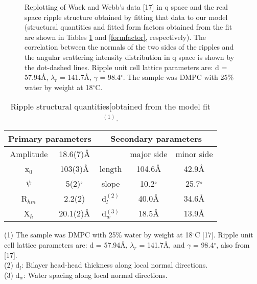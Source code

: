 \pagebreak

\begin{figure}
\centerline {}
\vspace{11pt}
\caption{Replotting of Wack and Webb's data [17] in q space and the 
real space
ripple structure obtained by fitting that data to our model (structural
quantities and fitted form factors obtained from the fit 
are shown in Tables \ref{parameter} and \ref{formfactor}, respectively). 
The correlation between the normals of the two sides of the ripples and the 
angular scattering intensity distribution in q space is shown by the
dot-dashed lines. Ripple unit cell lattice parameters are: d = 57.94\AA, 
$\lambda_r$ = 141.7\AA, $\gamma$ = 98.4$^{\circ}$. The sample was DMPC with 
25\% water by weight at 18$^{\circ}$C.
\label{wack_data}}
\end{figure}

\pagebreak

\begin{table}
\caption{Ripple structural quantities[obtained from the model fit$^{(1)}$.
\label{parameter}}
\vspace{6pt}
{\tabcolsep=0.35in
\begin{tabular}{c|c||c|c|c} 
\multicolumn{2}{c||}{Primary parameters} & 
\multicolumn{3}{c}{Secondary parameters} \\ \hline
Amplitude & 18.6(7)\AA & & major side & minor side \\ \cline{4-5}
x$_0$ & 103(3)\AA & length & 104.6\AA & 42.9\AA \\
$\psi$ & 5(2)$^{\circ}$ & slope & 10.2$^{\circ}$ & 25.7$^{\circ}$ \\
R$_{hm}$ & 2.2(2) & d$_l^{(2)}$ & 40.0\AA & 34.6\AA \\
X$_h$ & 20.1(2)\AA & d$_w^{(3)}$ & 18.5\AA & 13.9\AA \\
\end{tabular}
}
\vspace{5pt}
{\small
\indent (1) The sample was DMPC with 25\% water by weight at 
		18$^{\circ}$C [17]. Ripple unit cell lattice parameters 
	are: d = 57.94\AA, $\lambda_r$ = 141.7\AA, and $\gamma$ = 
	98.4$^{\circ}$, also from [17]. \\
\indent (2)  d$_l$: Bilayer head-head thickness along local normal
		directions. \\
\indent (3)  d$_w$: Water spacing along local normal
		directions.
}
\end{table}

